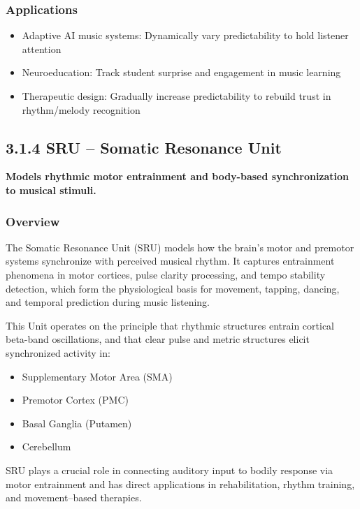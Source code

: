 \documentclass[10pt]{article}
\begin{document}
\subsubsection*{Applications}

\begin{itemize}
    \item Adaptive AI music systems: Dynamically vary predictability to hold listener attention
    \item Neuroeducation: Track student surprise and engagement in music learning
    \item Therapeutic design: Gradually increase predictability to rebuild trust in rhythm/melody recognition
\end{itemize}

\subsection*{3.1.4 SRU – Somatic Resonance Unit}

\textbf{Models rhythmic motor entrainment and body-based synchronization to musical stimuli.}

\subsubsection*{Overview}

The Somatic Resonance Unit (SRU) models how the brain's motor and premotor systems synchronize with perceived musical rhythm. It captures entrainment phenomena in motor cortices, pulse clarity processing, and tempo stability detection, which form the physiological basis for movement, tapping, dancing, and temporal prediction during music listening.

This Unit operates on the principle that rhythmic structures entrain cortical beta-band oscillations, and that clear pulse and metric structures elicit synchronized activity in:

\begin{itemize}
    \item Supplementary Motor Area (SMA)
    \item Premotor Cortex (PMC)
    \item Basal Ganglia (Putamen)
    \item Cerebellum
\end{itemize}

SRU plays a crucial role in connecting auditory input to bodily response via motor entrainment and has direct applications in rehabilitation, rhythm training, and movement–based therapies.
\end{document}
